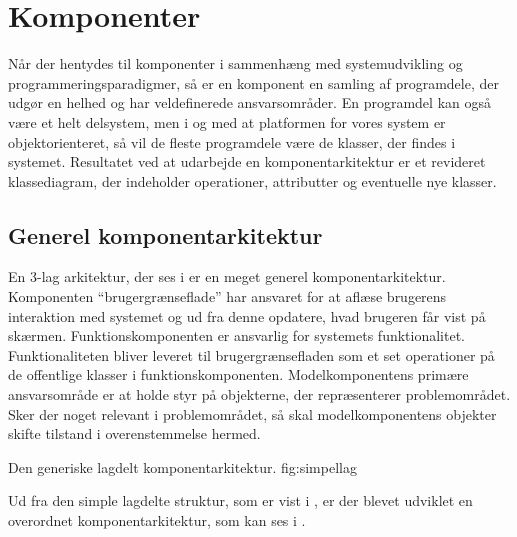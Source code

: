 \section{Komponenter}
\label{sec:komponenter}
Når der hentydes til komponenter i sammenhæng med systemudvikling og programmeringsparadigmer, så er en komponent en samling af programdele, der udgør en helhed og har veldefinerede ansvarsområder. En programdel kan også være et helt delsystem, men i og med at platformen for vores system er objektorienteret, så vil de fleste programdele være de klasser, der findes i systemet\cite[s.~191]{ooad}. 
Resultatet ved at udarbejde en komponentarkitektur er et revideret klassediagram, der indeholder operationer, attributter og eventuelle nye klasser.

\subsection{Generel komponentarkitektur}
En 3-lag arkitektur, der ses i  er en meget generel komponentarkitektur\cite{Eckerson1995}.
Komponenten ``brugergrænseflade'' har ansvaret for at aflæse brugerens interaktion med systemet og ud fra denne opdatere, hvad brugeren får vist på skærmen. 
Funktionskomponenten er ansvarlig for systemets funktionalitet. Funktionaliteten bliver leveret til brugergrænsefladen som et set operationer på de offentlige klasser i funktionskomponenten. 
Modelkomponentens primære ansvarsområde er at holde styr på objekterne, der repræsenterer problemområdet. Sker der noget relevant i problemområdet, så skal modelkomponentens objekter skifte tilstand i overenstemmelse hermed.

	{Den generiske lagdelt komponentarkitektur.}
	{fig:simpellag}

Ud fra den simple lagdelte struktur, som er vist i , er der blevet udviklet en overordnet komponentarkitektur, som kan ses i .




